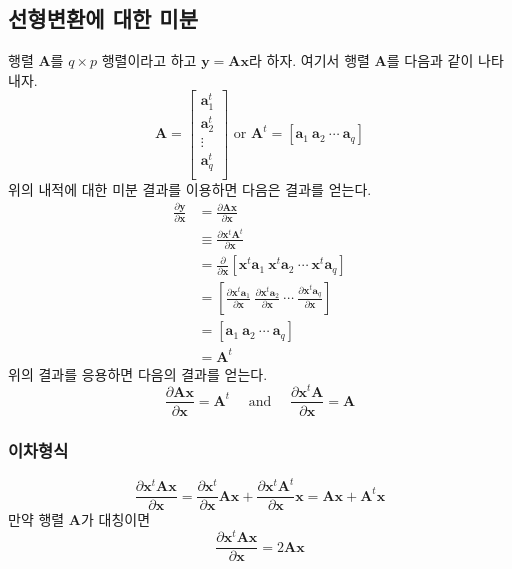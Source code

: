 \documentclass[
]{book}
\newcommand{\pardiff}[2]{\frac{\partial #1}{\partial #2 }}
\theoremstyle{definition}
\theoremstyle{definition}
\theoremstyle{definition}
\theoremstyle{remark}
\begin{document}
\hypertarget{uxc120uxd615uxbcc0uxd658uxc5d0-uxb300uxd55c-uxbbf8uxbd84}{%
\subsection{선형변환에 대한 미분}\label{uxc120uxd615uxbcc0uxd658uxc5d0-uxb300uxd55c-uxbbf8uxbd84}}

행렬 \(\bm A\)를 \(q \times p\) 행렬이라고 하고 \(\bm y = \bm A \bm x\)라 하자. 여기서 행렬 \(\bm A\)를 다음과 같이 나타내자.
\[ \bm A = \begin{bmatrix}
\bm a_1^t \\
\bm a_2^t \\
\vdots \\
\bm a_q^t \\
\end{bmatrix} \text{ or }
\bm A^t = [ \bm a_1~ \bm a_2~\cdots~\bm a_q]
\]
위의 내적에 대한 미분 결과를 이용하면 다음은 결과를 얻는다.
\begin{align*}
\pardiff{ \bm y}{\bm x} & =  \pardiff{ \bm A \bm x}{\bm x}                                                                                           \\
   & \equiv \pardiff{ \bm x^t \bm A^t }{\bm x}                                                                                  \\
   & =  \pardiff{ }{\bm x} [  \bm x^t \bm a_1 ~ \bm x^t \bm a_2 ~ \cdots ~\bm x^t \bm a_q ]                                     \\
   & =  [   \pardiff{\bm x^t \bm a_1 }{\bm x} ~ \pardiff{\bm x^t \bm a_2 }{\bm x} ~ \cdots ~\pardiff{\bm x^t \bm a_q }{\bm x} ] \\
   & = [  \bm a_1 ~  \bm a_2 ~ \cdots ~ \bm a_q ]                                                                               \\
   & = \bm A^t
\end{align*}
위의 결과를 응용하면 다음의 결과를 얻는다.
\[ \pardiff{ \bm A \bm x}{\bm x} = \bm A^t \quad  \text{ and } \quad \pardiff{  \bm x^t \bm A}{\bm x} = \bm A \]

\hypertarget{uxc774uxcc28uxd615uxc2dd}{%
\subsubsection{이차형식}\label{uxc774uxcc28uxd615uxc2dd}}

\[ \pardiff{\bm x^t \bm A \bm x}{\bm x} =\pardiff{\bm x^t}{\bm x} \bm  A \bm x +
\pardiff{ \bm x^t \bm A^t }{\bm x} \bm x =  \bm A \bm x + \bm A^t \bm x \]
만약 행렬 \(\bm A\)가 대칭이면
\[ \pardiff{\bm x^t \bm A \bm x}{\bm x} = 2 \bm A \bm x \]
\end{document}
